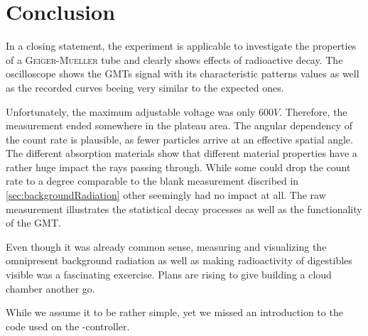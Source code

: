 \chapter{Conclusion}
%
In a closing statement, the experiment is applicable to investigate the properties of a \textsc{Geiger-Mueller} tube and
clearly shows effects of radioactive decay. The oscilloscope shows the GMTs signal with its characteristic patterns
values as well as the recorded curves beeing very similar to the expected ones.\par
Unfortunately, the maximum adjustable voltage was only \( 600 V \). Therefore, the measurement ended somewhere in the
plateau area. The angular dependency of the count rate is plausible, as fewer particles arrive at an effective spatial
angle. The different absorption materials show that different material properties have a rather huge impact the rays passing
through. While some could drop the count rate to a degree comparable to the blank measurement discribed in \cref{sec:backgroundRadiation}
other seemingly had no impact at all. The raw measurement illustrates the statistical decay processes as well as the
functionality of the GMT.\par
Even though it was already common sense, measuring and visualizing the omnipresent background radiation as well as making
radioactivity of digestibles visible was a fascinating excercise. Plans are rising to give building a cloud chamber another
go.\par\medskip
While we assume it to be rather simple, yet we missed an introduction to the code used on the \micro-controller.
